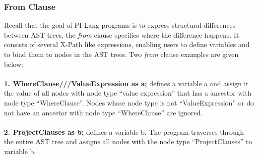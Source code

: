 \subsubsection{From Clause}
Recall that the goal of PI-Lang programs is to express structural differences between AST trees, the \emph{from} clause specifies where the difference happens. It consists of several X-Path like expressions, enabling users to define variables and to bind them to nodes in the AST trees. Two \emph{from} clause examples are given below:\\\\
\textbf{1. WhereClause///ValueExpression as a;} defines a variable a and assign it the value of all nodes with node type “value expression” that has a ancestor with node type “WhereClause”. Nodes whose node type is not “ValueExpression” or do not have an ancestor with node type “WhereClause” are ignored. \\\\
\textbf{2. ProjectClauses as b;} defines a variable b. The program traverses through the entire AST tree and assigns all nodes with the node type “ProjectClauses” to variable b.\\


